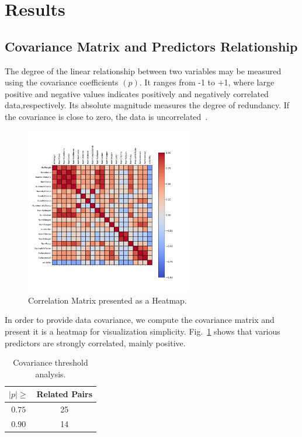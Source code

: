 
\section{Results}

\subsection{Covariance Matrix and Predictors Relationship}
The degree of the linear relationship between two variables may be measured using the covariance coefficients $(p)$. It ranges from -1 to +1, where large positive and negative values indicates positively and negatively correlated data,respectively. Its absolute magnitude measures the degree of redundancy. If the covariance is close to zero, the data is uncorrelated~\cite{Kuhn2013}.

\begin{figure}[htbp!]
  \centerline{\includegraphics[width=0.65\textwidth]{../../code/hw2/figures/1-correlation_matrix.pdf}}
  \caption{Correlation Matrix presented as a Heatmap.}
  \label{fig:1-correlation_matrix}
\end{figure}

In order to provide data covariance, we compute the covariance matrix and present it is a heatmap for visualization simplicity. Fig.~\ref{fig:1-correlation_matrix} shows that various predictors are strongly correlated, mainly positive.

\begin{table}[htbp]
  \caption{Covariance threshold analysis.}
  \begin{center}
  \begin{tabular}{|c|c|}
          \hline 
          $|p| \geq$ & Related Pairs\\
          \hline
          $0.75$ & 25\\
          \hline
          $0.90$ & 14 \\
          \hline
  \end{tabular}
  \label{tab:Covariance}
  \end{center}
  \end{table}

